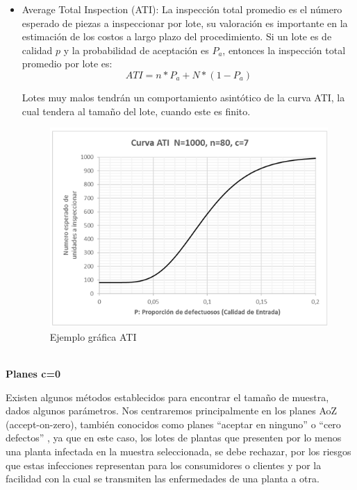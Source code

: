 \begin{itemize}
\item Average Total Inspection (ATI): La inspecci\'{o}n total promedio es el n\'{u}mero esperado de piezas a inspeccionar por lote, su valoraci\'{o}n es importante en la estimaci\'{o}n de los costos a largo plazo del procedimiento. Si un lote es de calidad $p$ y la probabilidad de aceptaci\'{o}n es $P_a$, entonces la inspecci\'{o}n total promedio por lote es:
$$ATI=n*P_a +N*(1-P_a)$$

Lotes muy malos tendr\'{a}n un comportamiento asint\'{o}tico de la curva ATI, la cual tendera al tama\~{n}o del lote, cuando este es finito.

\begin{figure}[h!]
  \centering
  \includegraphics[scale=0.8]{IMAGENES/Figura3.png}
  \caption{Ejemplo gr\'{a}fica ATI}
\end{figure}
\end{itemize}

\pagebreak
~\\\textbf{Planes c=0}

Existen algunos m\'{e}todos establecidos para encontrar el tama\~{n}o de muestra, dados algunos par\'{a}metros. Nos centraremos principalmente en los planes AoZ (accept-on-zero), tambi\'{e}n conocidos como planes ``aceptar en ninguno'' o ``cero defectos'' , ya que en este caso, los lotes de plantas que presenten por lo menos una planta infectada en la muestra seleccionada, se debe rechazar, por los riesgos que estas infecciones representan para los consumidores o clientes y por la facilidad con la cual se transmiten las enfermedades de una planta a otra.

